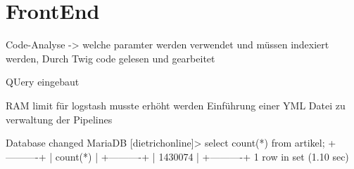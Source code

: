 \chapter{FrontEnd}

Code-Analyse -> welche paramter werden verwendet und müssen indexiert werden,
Durch Twig code gelesen und gearbeitet

QUery eingebaut

RAM limit für logstash musste erhöht werden
Einführung einer YML Datei zu verwaltung der Pipelines

Database changed
MariaDB [dietrichonline]> select count(*) from artikel;
+----------+
| count(*) |
+----------+
|  1430074 |
+----------+
1 row in set (1.10 sec)

